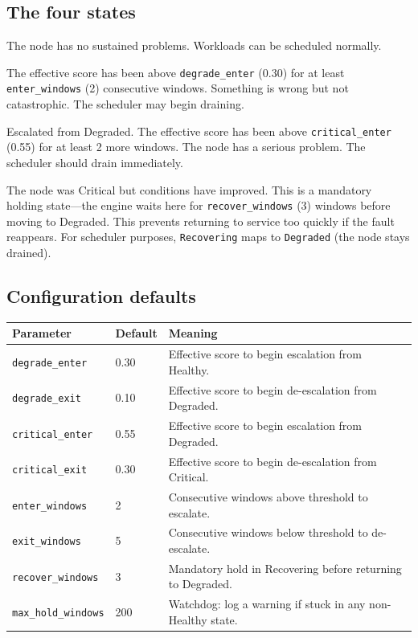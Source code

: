 \documentclass[11pt]{article}
\begin{document}
\subsection{The four states}

\begin{description}[style=nextline,leftmargin=2cm]
  \item[\texttt{Healthy}]
    The node has no sustained problems. Workloads can be scheduled normally.

  \item[\texttt{Degraded}]
    The effective score has been above \texttt{degrade\_enter} (0.30) for at
    least \texttt{enter\_windows} (2) consecutive windows. Something is wrong
    but not catastrophic. The scheduler may begin draining.

  \item[\texttt{Critical}]
    Escalated from Degraded. The effective score has been above
    \texttt{critical\_enter} (0.55) for at least 2 more windows. The node has
    a serious problem. The scheduler should drain immediately.

  \item[\texttt{Recovering}]
    The node was Critical but conditions have improved. This is a mandatory
    holding state---the engine waits here for \texttt{recover\_windows} (3)
    windows before moving to Degraded. This prevents returning to service
    too quickly if the fault reappears. For scheduler purposes,
    \texttt{Recovering} maps to \texttt{Degraded} (the node stays drained).
\end{description}

\subsection{Configuration defaults}

\begin{center}
\begin{tabular}{llp{7cm}}
\toprule
Parameter & Default & Meaning \\
\midrule
\texttt{degrade\_enter}   & 0.30 & Effective score to begin escalation from Healthy. \\
\texttt{degrade\_exit}    & 0.10 & Effective score to begin de-escalation from Degraded. \\
\texttt{critical\_enter}  & 0.55 & Effective score to begin escalation from Degraded. \\
\texttt{critical\_exit}   & 0.30 & Effective score to begin de-escalation from Critical. \\
\texttt{enter\_windows}   & 2    & Consecutive windows above threshold to escalate. \\
\texttt{exit\_windows}    & 5    & Consecutive windows below threshold to de-escalate. \\
\texttt{recover\_windows} & 3    & Mandatory hold in Recovering before returning to Degraded. \\
\texttt{max\_hold\_windows} & 200 & Watchdog: log a warning if stuck in any non-Healthy state. \\
\bottomrule
\end{tabular}
\end{center}
\end{document}
